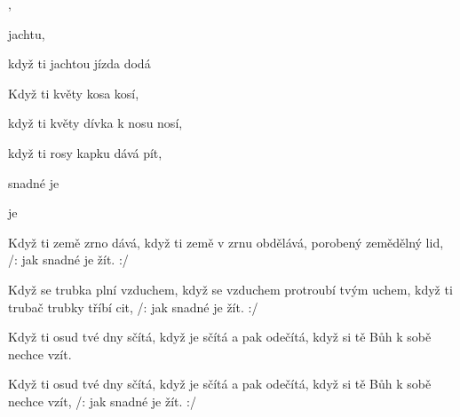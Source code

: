 

   

\zr
{}   ,

   jachtu,

když ti jachtou jízda dodá 
  
\kr

\zs
Když ti květy kosa kosí,

když ti květy dívka k nosu nosí,

když ti rosy kapku dává pít,

 snadné je 

 je 
\ks

\zr \kr

\zs
Když ti země zrno dává,
když ti země v zrnu obdělává,
porobený zemědělný lid,
/: jak snadné je žít. :/
\ks

\zr \kr

\zs
Když se trubka plní vzduchem,
když se vzduchem protroubí tvým uchem,
když ti trubač trubky tříbí cit,
/: jak snadné je žít. :/
\ks

\zs
Když ti osud tvé dny sčítá,
když je sčítá a pak odečítá,
když si tě Bůh k sobě nechce vzít.
\ks

\zs
Když ti osud tvé dny sčítá,
když je sčítá a pak odečítá,
když si tě Bůh k sobě nechce vzít,
/: jak snadné je žít. :/
\ks

\kp
